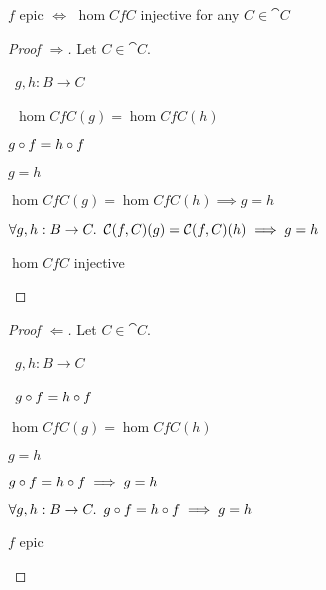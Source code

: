 \begin{prop}
  $f$ epic $\iff$ $\hom{C}{f}{C}$ injective for any $C\in\cat{C}$

  \begin{proof}[Proof $\Rightarrow$]
    Let $C\in\cat{C}$.
    \begin{itemize}
      \step
        \begin{itemize}
          \subp{\star} \Let~$g, h : B\to C$
            \marginnote{\Hyp}

          \step
            \begin{itemize}
              \subp{\dagger}
                \Ass~$\hom{C}{f}{C}(g) = \hom{C}{f}{C}(h)$
                \marginnote{\Hyp}

            \step[\iffs] $g\compose f = h\compose f$
              \marginnote{\Def-\ref{def:contra-hom}}

            \step[\imps] $g = h$
            \end{itemize}

          \step[\imps] $\hom{C}{f}{C}(g) = \hom{C}{f}{C}(h) \implies g = h$
            \marginnote{$\imps$-\Intro}
        \end{itemize}
      \step[\imps] $\forall g, h : B \to C\ldotp~\hom{C}{f}{C}(g) = \hom{C}{f}{C}(h) \implies g = h$
        \marginnote{$\forall$-\Intro}

      \step[\iffs] $\hom{C}{f}{C}$ injective
        \qedhere
    \end{itemize}
  \end{proof}

  \begin{proof}[Proof $\Leftarrow$]
    Let $C\in\cat{C}$.
    \begin{itemize}
      \step
        \begin{itemize}
          \subp{\star}
            \Let~$g, h : B\to C$
            \marginnote{\Hyp}

          \step
            \begin{itemize}
            \subp{\dagger}
              \Ass~$g\compose f = h\compose f$
              \marginnote{\Hyp}

            \step[\iffs] $\hom{C}{f}{C}(g) = \hom{C}{f}{C}(h)$
              \marginnote{\Def-\ref{def:contra-hom}}

            \step[\imps] $g = h$
            \end{itemize}

          \step[\imps] $g\compose f = h\compose f \implies g = h$
            \marginnote{$\imps$-\Intro}
        \end{itemize}
      \step[\imps] $\forall g, h : B \to C\ldotp~g\compose f = h\compose f \implies g = h$
        \marginnote{$\forall$-\Intro}

      \step[\iffs] $f$ epic
        \qedhere
    \end{itemize}
  \end{proof}
\end{prop}

